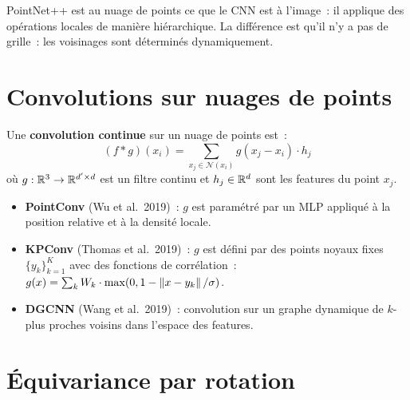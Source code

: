 \begin{intuition}
PointNet++ est au nuage de points ce que le CNN est \`a l'image~:
il applique des op\'erations locales de mani\`ere hi\'erarchique.
La diff\'erence est qu'il n'y a pas de grille~: les voisinages
sont d\'etermin\'es dynamiquement.
\end{intuition}

\section{Convolutions sur nuages de points}
\label{sec:convolutions}

\begin{definition}
Une \textbf{convolution continue} sur un nuage de points est~:
\[
  (f * g)(x_i) = \sum_{x_j \in \mathcal{N}(x_i)}
  g(x_j - x_i) \cdot h_j
\]
o\`u $g : \mathbb{R}^3 \to \mathbb{R}^{d' \times d}$ est un filtre continu
et $h_j \in \mathbb{R}^d$ sont les features du point $x_j$.
\end{definition}

\begin{exemple}
\begin{itemize}
  \item \textbf{PointConv} (Wu et al.\ 2019)~: $g$ est param\'etr\'e
        par un MLP appliqu\'e \`a la position relative et \`a la
        densit\'e locale.
  \item \textbf{KPConv} (Thomas et al.\ 2019)~: $g$ est d\'efini
        par des points noyaux fixes $\{y_k\}_{k=1}^K$
        avec des fonctions de corr\'elation~:
        $g(x) = \sum_k W_k \cdot \max(0, 1 - \left\| x - y_k \right\|/\sigma)$.
  \item \textbf{DGCNN} (Wang et al.\ 2019)~: convolution sur un
        graphe dynamique de $k$-plus proches voisins dans l'espace
        des features.
\end{itemize}
\end{exemple}

\section{\'Equivariance par rotation}
\label{sec:equivariance_rotation}

